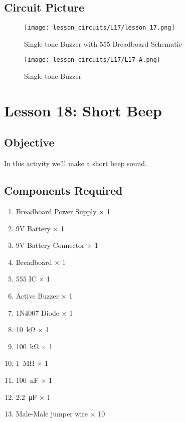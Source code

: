 \subsection{Circuit Picture}
\begin{figure}[!htp]
    \centering
    \texttt{[image: lesson\_circuits/L17/lesson\_17.png]}
    \caption{Single tone Buzzer with 555 Breadboard Schematic}
    \label{fig:555_sbuz_sch}
\end{figure}
\begin{figure}[!htp]
    \centering
    \texttt{[image: lesson\_circuits/L17/L17-A.png]}
    \caption{Single tone Buzzer}
    \label{fig:555_sbuz_obb}
\end{figure}
\clearpage
\section{Lesson 18: Short Beep}
\subsection{Objective}
In this activity we'll make a short beep sound.
\subsection{Components Required}
\begin{enumerate}
    \item Breadboard Power Supply $\times$ 1
    \item 9V Battery $\times$ 1
    \item 9V Battery Connector $\times$ 1
    \item Breadboard $\times$ 1
    \item 555 IC $\times$ 1
    \item Active Buzzer $\times$ 1
    \item 1N4007 Diode $\times$ 1
    \item \SI{10}{\kilo\ohm} $\times$ 1
    \item \SI{100}{\kilo\ohm} $\times$ 1
    \item \SI{1}{\Mohm} $\times$ 1
    \item \SI{100}{\nano\farad} $\times$ 1
    \item \SI{2.2}{\micro\farad} $\times$ 1
    \item Male-Male jumper wire $\times$ 10
\end{enumerate}
